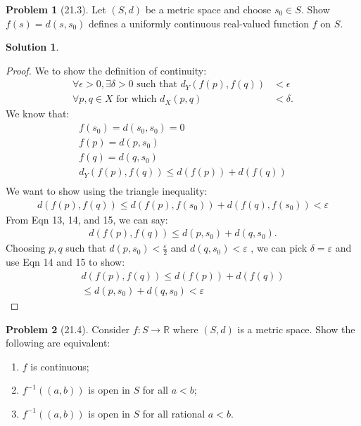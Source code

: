 \documentclass[12pt]{article}
\theoremstyle{definition} %
\newtheorem{solution}{Solution}
\newtheorem{problem}{Problem}
\theoremstyle{plain} %
\begin{document}
\begin{problem}[21.3]
    Let $(S,d)$ be a metric space and choose $s_{0} \in S$. Show $f(s)=d(s,s_{0})$ defines a uniformly continuous real-valued function $f$ on $S$.
\end{problem}
\begin{solution}
\begin{proof}
  We to show the definition of continuity:
  \begin{align}
    \forall \epsilon > 0, \exists \delta > 0 \text{ such that } d_Y(f(p), f(q)) &< \epsilon \\
    \forall p, q \in X \text{ for which } d_X(p, q) &< \delta. 
    \end{align}
    We know that:
    \begin{align}
      f(s_0) = d(s_0, s_0) = 0 \\[10pt] 
      f(p)= d(p, s_0) \\[10pt] 
      f(q)= d(q, s_0) \\[10pt] 
      d_Y(f(p),f(q))\leq d(f(p)) + d(f(q))\\[10pt] 
    \end{align}
We want to show using the triangle inequality:
\begin{align} 
      d(f(p),f(q))\leq d(f(p),f(s_0))+d(f(q),f(s_0))< \varepsilon
\end{align}
From Eqn 13, 14, and 15, we can say: 
\begin{align}
  d(f(p),f(q))\leq d(p,s_0)+d(q,s_0).
\end{align}
Choosing $p,q$ such that $d(p,s_0)<\frac{\varepsilon}{2}$ and $d(q,s_0)<\varepsilon$ , we can pick $\delta =\varepsilon$ and use Eqn 14 and 15 to show:
\begin{align}
  d(f(p),f(q))\leq d(f(p))+d(f(q))\\[10pt] 
  \leq d(p,s_0)+d(q,s_0)<\varepsilon
\end{align} 
\end{proof}
\end{solution}
\begin{problem}[21.4]
    Consider $f:S\to \mathbb{R} $ where $(S,d)$ is a metric space. Show the following are equivalent:
    \begin{enumerate}
        \item $f$ is continuous;
        \item $f^{-1}((a,b)) $ is open in $S$ for all $a<b$;
        \item $f^{-1}((a,b))$ is open in $S$ for all rational $a<b$.
    \end{enumerate}
\end{problem}
\end{document}
